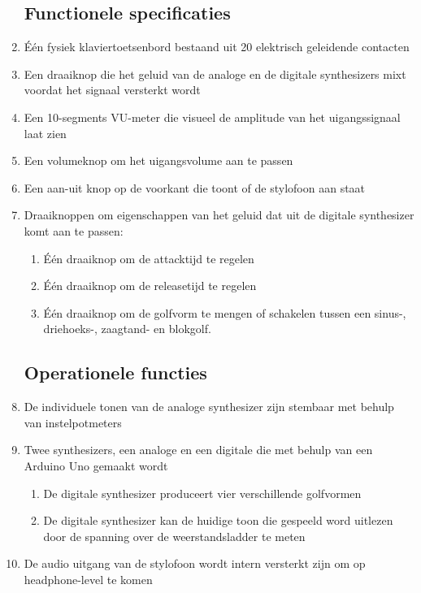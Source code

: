 \documentclass[12pt, a4paper, dutch]{article}
\begin{document}
\begin{enumerate}
\subsection{Functionele specificaties}
	\item \label{req:20keys} \'E\'en fysiek klaviertoetsenbord bestaand uit 20
		elektrisch geleidende contacten
	\item \label{req:mixfader} Een draaiknop die het geluid van de analoge en de
		digitale synthesizers mixt voordat het signaal versterkt wordt
	\item \label{req:vumeter} Een 10-segments VU-meter die visueel de amplitude van het
		uigangssignaal laat zien
	\item \label{req:volknob} Een volumeknop om het uigangsvolume aan te passen
	\item \label{req:powerbutton} Een aan-uit knop op de voorkant die toont of de stylofoon
		aan staat
	\item \label{req:digsoundtweak} Draaiknoppen om eigenschappen van het geluid dat
		uit de digitale synthesizer komt aan te passen:
	\begin{enumerate}
		\item \label{req:attack} \'E\'en draaiknop om de attacktijd te regelen
		\item \label{req:release} \'E\'en draaiknop om de releasetijd te regelen
		\item \label{req:wavform} \'E\'en draaiknop om de golfvorm te mengen of schakelen
			tussen een sinus-, driehoeks-, zaagtand- en blokgolf.
	\end{enumerate}
\subsection{Operationele functies}
	\item \label{req:tuneable} De individuele tonen van de analoge synthesizer zijn
		stembaar met behulp van instelpotmeters
	\item \label{req:engines} Twee synthesizers, een analoge en een digitale die met
		behulp van een Arduino Uno gemaakt wordt
	\begin{enumerate}
		\item \label{req:wavforms} De digitale synthesizer produceert vier verschillende
			golfvormen
		\item \label{req:readtone} De digitale synthesizer kan de huidige toon die
			gespeeld word uitlezen door de spanning over de weerstandsladder te meten
	\end{enumerate}
	\item \label{req:phonesout} De audio uitgang van de stylofoon wordt intern
		versterkt zijn om op headphone-level te komen

\end{enumerate}
\end{document}
